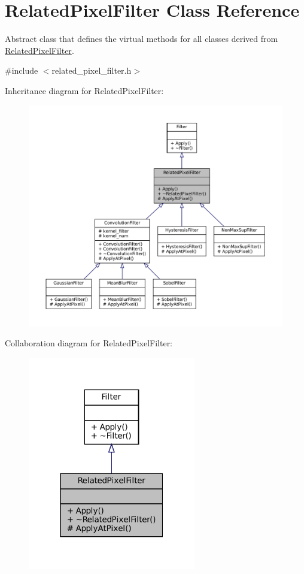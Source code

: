 \hypertarget{classRelatedPixelFilter}{}\section{Related\+Pixel\+Filter Class Reference}
\label{classRelatedPixelFilter}


Abstract class that defines the virtual methods for all classes derived from \hyperlink{classRelatedPixelFilter}{Related\+Pixel\+Filter}.  




{\ttfamily \#include $<$related\+\_\+pixel\+\_\+filter.\+h$>$}



Inheritance diagram for Related\+Pixel\+Filter\+:\nopagebreak
\begin{figure}[H]
\begin{center}
\leavevmode
\includegraphics[width=350pt]{classRelatedPixelFilter__inherit__graph}
\end{center}
\end{figure}


Collaboration diagram for Related\+Pixel\+Filter\+:\nopagebreak
\begin{figure}[H]
\begin{center}
\leavevmode
\includegraphics[width=208pt]{classRelatedPixelFilter__coll__graph}
\end{center}
\end{figure}
